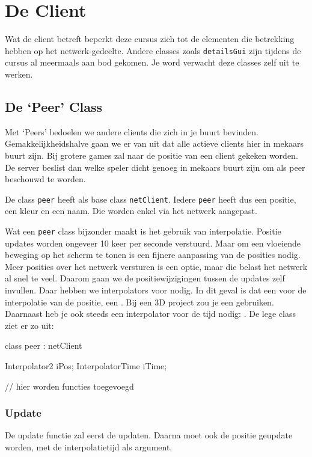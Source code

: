 \chapter{De Client}

Wat de client betreft beperkt deze cursus zich tot de elementen die betrekking hebben op het netwerk-gedeelte. Andere classes zoals \texttt{detailsGui} zijn tijdens de cursus al meermaals aan bod gekomen. Je word verwacht deze classes zelf uit te werken.

\section{De `Peer' Class}
Met `Peers' bedoelen we andere clients die zich in je buurt bevinden. Gemakkelijkheidshalve gaan we er van uit dat alle actieve clients hier in mekaars buurt zijn. Bij grotere games zal naar de positie van een client gekeken worden. De server beslist dan welke speler dicht genoeg in mekaars buurt zijn om als peer beschouwd te worden.

De class \texttt{peer} heeft als base class \texttt{netClient}. Iedere \texttt{peer} heeft dus een positie, een kleur en een naam. Die worden enkel via het netwerk aangepast. 

Wat een \texttt{peer} class bijzonder maakt is het gebruik van interpolatie. Positie updates worden ongeveer 10 keer per seconde verstuurd. Maar om een vloeiende beweging op het scherm te tonen is een fijnere aanpassing van de posities nodig. Meer posities over het netwerk versturen is een optie, maar die belast het netwerk al snel te veel. Daarom gaan we de positiewijzigingen tussen de updates zelf invullen. Daar hebben we interpolators voor nodig. In dit geval is dat een  voor de interpolatie van de positie, een . Bij een 3D project zou je een  gebruiken. Daarnaast heb je ook steeds een interpolator voor de tijd nodig: . De lege class ziet er zo uit:

\begin{code}
class peer : netClient
{
   Interpolator2 iPos;
   InterpolatorTime iTime;
   
   // hier worden functies toegevoegd
}
\end{code} 

\subsection{Update}
De update functie zal eerst de  updaten. Daarna moet ook de positie geupdate worden, met de interpolatietijd als argument.

